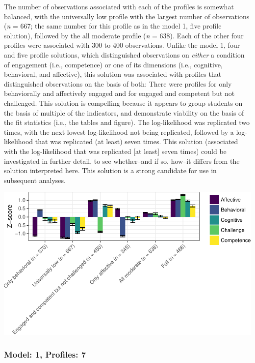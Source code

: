 \documentclass[]{book}
\theoremstyle{definition}
\theoremstyle{definition}
\theoremstyle{definition}
\theoremstyle{remark}
\begin{document}
The number of observations associated with each of the profiles is
somewhat balanced, with the universally low profile with the largest
number of observations (\emph{n} = 667; the same number for this profile
as in the model 1, five profile solution), followed by the all moderate
profile (\emph{n} = 638). Each of the other four profiles were
associated with 300 to 400 observations. Unlike the model 1, four and
five profile solutions, which distinguished observations on
\emph{either} a condition of engagement (i.e., competence) or one of its
dimensions (i.e., cognitive, behavioral, and affective), this solution
was associated with profiles that distinguished observations on the
basis of both: There were profiles for only behaviorally and affectively
engaged and for engaged and competent but not challenged. This solution
is compelling because it appears to group students on the basis of
multiple of the indicators, and demonstrate viability on the basis of
the fit statistics (i.e., the tables and figure). The log-likelihood was
replicated two times, with the next lowest log-likelihood not being
replicated, followed by a log-likelihood that was replicated (at least)
seven times. This solution (associated with the log-likelihood that was
replicated {[}at least{]} seven times) could be investigated in further
detail, to see whether--and if so, how--it differs from the solution
interpreted here. This solution is a strong candidate for use in
subsequent analyses.

\begin{center}\includegraphics[width=0.8\linewidth]{rosenberg-dissertation_files/figure-latex/m1_6p-1} \end{center}

\subsubsection{Model: 1, Profiles: 7}\label{model-1-profiles-7}
\end{document}
